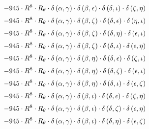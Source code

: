 \begin{subequations}
\begin{gather}
 \\[0.2em] \notag 		 - 945 \cdot R^{8} \cdot R_{\theta{}} \cdot \delta{}\left(\alpha{}, \gamma{}\right) \cdot \delta{}\left(\beta{}, \epsilon{}\right) \cdot \delta{}\left(\delta{}, \iota{}\right) \cdot \delta{}\left(\zeta{}, \eta{}\right) 
 \\[0.2em] \notag 		 - 945 \cdot R^{8} \cdot R_{\theta{}} \cdot \delta{}\left(\alpha{}, \gamma{}\right) \cdot \delta{}\left(\beta{}, \zeta{}\right) \cdot \delta{}\left(\delta{}, \epsilon{}\right) \cdot \delta{}\left(\eta{}, \iota{}\right) 
 \\[0.2em] \notag 		 - 945 \cdot R^{8} \cdot R_{\theta{}} \cdot \delta{}\left(\alpha{}, \gamma{}\right) \cdot \delta{}\left(\beta{}, \zeta{}\right) \cdot \delta{}\left(\delta{}, \eta{}\right) \cdot \delta{}\left(\epsilon{}, \iota{}\right) 
 \\[0.2em] \notag 		 - 945 \cdot R^{8} \cdot R_{\theta{}} \cdot \delta{}\left(\alpha{}, \gamma{}\right) \cdot \delta{}\left(\beta{}, \zeta{}\right) \cdot \delta{}\left(\delta{}, \iota{}\right) \cdot \delta{}\left(\epsilon{}, \eta{}\right) 
 \\[0.2em] \notag 		 - 945 \cdot R^{8} \cdot R_{\theta{}} \cdot \delta{}\left(\alpha{}, \gamma{}\right) \cdot \delta{}\left(\beta{}, \eta{}\right) \cdot \delta{}\left(\delta{}, \epsilon{}\right) \cdot \delta{}\left(\zeta{}, \iota{}\right) 
 \\[0.2em] \notag 		 - 945 \cdot R^{8} \cdot R_{\theta{}} \cdot \delta{}\left(\alpha{}, \gamma{}\right) \cdot \delta{}\left(\beta{}, \eta{}\right) \cdot \delta{}\left(\delta{}, \zeta{}\right) \cdot \delta{}\left(\epsilon{}, \iota{}\right) 
 \\[0.2em] \notag 		 - 945 \cdot R^{8} \cdot R_{\theta{}} \cdot \delta{}\left(\alpha{}, \gamma{}\right) \cdot \delta{}\left(\beta{}, \eta{}\right) \cdot \delta{}\left(\delta{}, \iota{}\right) \cdot \delta{}\left(\epsilon{}, \zeta{}\right) 
 \\[0.2em] \notag 		 - 945 \cdot R^{8} \cdot R_{\theta{}} \cdot \delta{}\left(\alpha{}, \gamma{}\right) \cdot \delta{}\left(\beta{}, \iota{}\right) \cdot \delta{}\left(\delta{}, \epsilon{}\right) \cdot \delta{}\left(\zeta{}, \eta{}\right) 
 \\[0.2em] \notag 		 - 945 \cdot R^{8} \cdot R_{\theta{}} \cdot \delta{}\left(\alpha{}, \gamma{}\right) \cdot \delta{}\left(\beta{}, \iota{}\right) \cdot \delta{}\left(\delta{}, \zeta{}\right) \cdot \delta{}\left(\epsilon{}, \eta{}\right) 
 \\[0.2em] \notag 		 - 945 \cdot R^{8} \cdot R_{\theta{}} \cdot \delta{}\left(\alpha{}, \gamma{}\right) \cdot \delta{}\left(\beta{}, \iota{}\right) \cdot \delta{}\left(\delta{}, \eta{}\right) \cdot \delta{}\left(\epsilon{}, \zeta{}\right) 

\end{gather}
\end{subequations}
